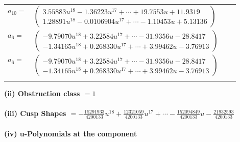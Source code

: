 \documentclass[1p]{elsarticle_modified}
\theoremstyle{definition}
\begin{document}
\begin{tabular}{m{7pt} m{180pt} m{7pt} m{180pt} }
\flushright $a_{10}=$&$\begin{pmatrix}3.55883 u^{18}-1.36223 u^{17}+\cdots+19.7553 u+11.9319\\1.28891 u^{18}-0.0106904 u^{17}+\cdots-1.10453 u+5.13136\end{pmatrix}$ \\
\flushright $a_{6}=$&$\begin{pmatrix}-9.79070 u^{18}+3.22584 u^{17}+\cdots-31.9356 u-28.8417\\-1.34165 u^{18}+0.268330 u^{17}+\cdots+3.99462 u-3.76913\end{pmatrix}$\\ \flushright $a_{6}=$&$\begin{pmatrix}-9.79070 u^{18}+3.22584 u^{17}+\cdots-31.9356 u-28.8417\\-1.34165 u^{18}+0.268330 u^{17}+\cdots+3.99462 u-3.76913\end{pmatrix}$\\&\end{tabular}
\flushleft \textbf{(ii) Obstruction class $= 1$}\\~\\
\flushleft \textbf{(iii) Cusp Shapes $= -\frac{15291933}{4200133} u^{18}+\frac{12321059}{4200133} u^{17}+\cdots-\frac{152094849}{4200133} u-\frac{21932593}{4200133}$}\\~\\
\newpage\renewcommand{\arraystretch}{1}
\flushleft \textbf{(iv) u-Polynomials at the component}\newline \\
\end{document}

